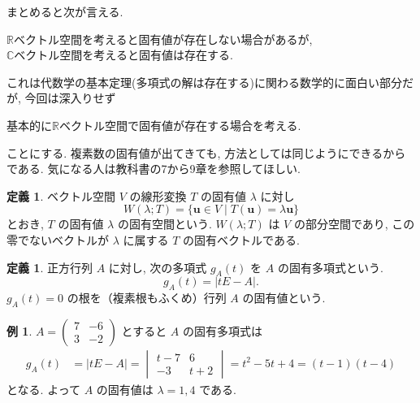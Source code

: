 \documentclass[dvipdfmx,a4paper,11pt]{article} %
\newcommand{\R}{\mathbb{R}}
\newcommand{\C}{\mathbb{C}}
\theoremstyle{definition}
\newtheorem{defn}[thm]{定義}
\newtheorem{ex}[thm]{例}
\begin{document}
まとめると次が言える. 
\begin{tcolorbox}[mybox]
\begin{center}
$\R$ベクトル空間を考えると固有値が存在しない場合があるが, \\
$\C$ベクトル空間を考えると固有値は存在する.
\end{center}
\end{tcolorbox}
これは代数学の基本定理(多項式の解は存在する)に関わる数学的に面白い部分だが, 今回は深入りせず
\begin{tcolorbox}[mybox]
\begin{center}
基本的に$\R$ベクトル空間で固有値が存在する場合を考える. 
\end{center}
\end{tcolorbox}
ことにする. 複素数の固有値が出てきても, 方法としては同じようにできるからである. 
気になる人は教科書の7から9章を参照してほしい. 

\begin{defn}
ベクトル空間 $V$ の線形変換 $T$ の固有値 $\lambda$ に対し
\[
W(\lambda;T)=\{\bm{u}\in V\mid T(\bm{u})=\lambda \bm{u}\}
\]
とおき, $T$ の固有値 $\lambda$ の固有空間という. $W(\lambda;T)$ は $V$ の部分空間であり, この零でないベクトルが $\lambda$ に属する $T$ の固有ベクトルである.
\end{defn}

\begin{defn}
正方行列 $A$ に対し, 次の多項式 $g_A(t)$ を $A$ の固有多項式という.
\[
g_A(t)=\lvert tE-A\rvert.
\]
$g_A(t)=0$ の根を（複素根もふくめ）行列 $A$ の固有値という.
\end{defn}
\begin{ex}%

\(
A=
\begin{pmatrix}
7&-6\\
3&-2
\end{pmatrix}
\)
とすると $A$ の固有多項式は
\[
\begin{aligned}
g_A(t)
&=\lvert tE-A\rvert
=
\begin{vmatrix}
t-7&6\\
-3&t+2
\end{vmatrix}
=t^2-5t+4
=(t-1)(t-4)
\end{aligned}
\]
となる. よって $A$ の固有値は $\lambda=1,4$ である.
\end{ex}
\end{document}
